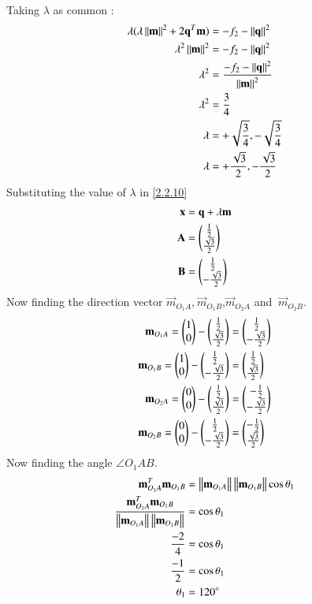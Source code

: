 \documentclass[journal,12pt,twocolumn]{IEEEtran}
\begin{document}
Taking $\lambda$ as common :
\begin{align}
\lambda(\lambda\left\lVert\mathbf{m}\right\rVert^2+2\mathbf{q}^T\mathbf{m})&= -f_2-\left\lVert\mathbf{q}\right\rVert^2\\
\lambda^2\left\lVert\mathbf{m}\right\rVert^2&= -f_2-\left\lVert\mathbf{q}\right\rVert^2\\
\lambda^2&= \frac{-f_2-\left\lVert\mathbf{q}\right\rVert^2}{\left\lVert\mathbf{m}\right\rVert^2} \\
\lambda^2&= \frac{3}{4} \\
\lambda&= +\sqrt{\frac{3}{4}},-\sqrt{\frac{3}{4}} \\
\lambda&= +\frac{\sqrt{3}}{2},-\frac{\sqrt{3}}{2} 
\end{align}
Substituting the value of $\lambda$ in \eqref{2.2.10}
\begin{align}
\mathbf{x}&= \mathbf{q}+\lambda\mathbf{m} \\
\mathbf{A}&= \begin{pmatrix}\frac{1}{2} \\ \frac{\sqrt{3}}{2}\end{pmatrix} \\
\mathbf{B}&= \begin{pmatrix}\frac{1}{2} \\ -\frac{\sqrt{3}}{2}\end{pmatrix}
\end{align} 
Now finding the direction vector $ \vec{m}_{O_1A}$,$\
\vec{m}_{O_1B}$,$ \vec{m}_{O_2A}$ and $\ \vec{m}_{O_2B}$.
\begin{align}
\mathbf{m}_{O_1A}=\begin{pmatrix}1\\0\end{pmatrix}-\begin{pmatrix}\frac{1}{2} \\ \frac{\sqrt{3}}{2}\end{pmatrix}&=\begin{pmatrix}\frac{1}{2}\\-\frac{\sqrt{3}}{2}\end{pmatrix}\\
\mathbf{m}_{O_1B}=\begin{pmatrix}1\\0\end{pmatrix}-\begin{pmatrix}\frac{1}{2} \\ -\frac{\sqrt{3}}{2}\end{pmatrix}&=\begin{pmatrix}\frac{1}{2}\\\frac{\sqrt{3}}{2}\end{pmatrix}\\
\mathbf{m}_{O_2A}=\begin{pmatrix}0\\0\end{pmatrix}-\begin{pmatrix}\frac{1}{2} \\ \frac{\sqrt{3}}{2}\end{pmatrix}&=\begin{pmatrix}-\frac{1}{2}\\-\frac{\sqrt{3}}{2}\end{pmatrix}\\
\mathbf{m}_{O_2B}=\begin{pmatrix}0\\0\end{pmatrix}-\begin{pmatrix}\frac{1}{2} \\ -\frac{\sqrt{3}}{2}\end{pmatrix}&=\begin{pmatrix}-\frac{1}{2}\\\frac{\sqrt{3}}{2}\end{pmatrix}
\end{align}
Now finding the angle $\angle{O_1AB}$.
\begin{align}
\mathbf{m}_{O_1A}^T \mathbf{m}_{O_1B}&=\left\lVert \mathbf{m}_{O_1A}\right\rVert\left\lVert\mathbf{m}_{O_1B}\right\rVert\cos\theta_1\\
\frac{\mathbf{m}_{O_1A}^T \mathbf{m}_{O_1B}}{\left\lVert \mathbf{m}_{O_1A}\right\rVert\left\lVert\mathbf{m}_{O_1B}\right\rVert}&=\cos\theta_1\\
\frac{-2}{4}&=\cos\theta_1\\
\frac{-1}{2}&=\cos\theta_1\\
\theta_1&=120^{\circ}
\end{align}
\end{document}

